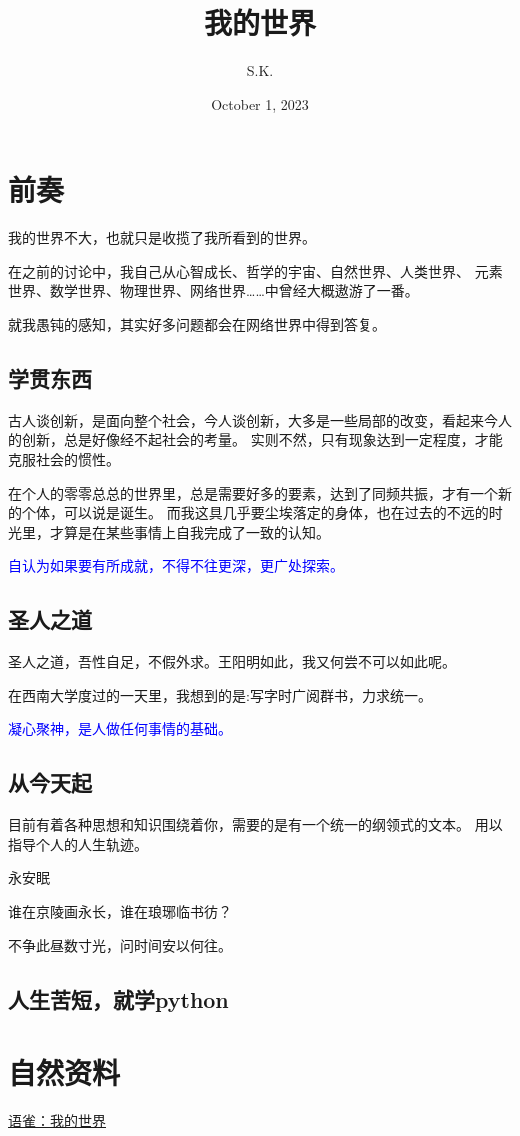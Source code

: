 \documentclass[cn,11pt]{elegantbook}
\title{我的世界}
\author{S.K.}
\institute{蹈微}
\date{October 1, 2023}
\begin{document}
\maketitle
\frontmatter
\tableofcontents%
\mainmatter

\chapter{前奏}

我的世界不大，也就只是收揽了我所看到的世界。

在之前的讨论中，我自己从心智成长、哲学的宇宙、自然世界、人类世界、
元素世界、数学世界、物理世界、网络世界……中曾经大概遨游了一番。

就我愚钝的感知，其实好多问题都会在网络世界中得到答复。


\section{学贯东西}

古人谈创新，是面向整个社会，今人谈创新，大多是一些局部的改变，看起来今人的创新，总是好像经不起社会的考量。
实则不然，只有现象达到一定程度，才能克服社会的惯性。

在个人的零零总总的世界里，总是需要好多的要素，达到了同频共振，才有一个新的个体，可以说是诞生。
而我这具几乎要尘埃落定的身体，也在过去的不远的时光里，才算是在某些事情上自我完成了一致的认知。

\textcolor{blue}{自认为如果要有所成就，不得不往更深，更广处探索。}

\section{圣人之道}

圣人之道，吾性自足，不假外求。王阳明如此，我又何尝不可以如此呢。


在西南大学度过的一天里，我想到的是:写字时广阅群书，力求统一。

\textcolor{blue}{凝心聚神，是人做任何事情的基础。}

\section{从今天起}
目前有着各种思想和知识围绕着你，需要的是有一个统一的纲领式的文本。
用以指导个人的人生轨迹。

永安眠

谁在京陵画永长，谁在琅琊临书彷？

不争此昼数寸光，问时间安以何往。

\section[short]{人生苦短，就学python}



\appendix
\chapter{自然资料}

\href{https://www.yuque.com/jibenqiejiangdeguawazi/twzv0m/go91tr}{\underline{语雀：我的世界}}
\end{document}
